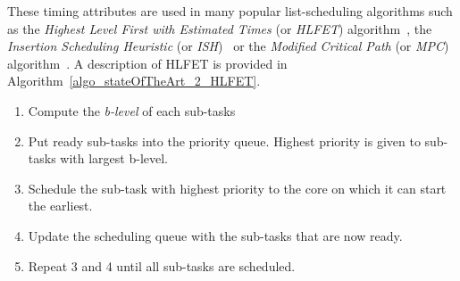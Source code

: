 \documentclass[main.tex]{subfiles}
\begin{document}
These timing attributes are used in many popular list-scheduling algorithms such as the \emph{Highest Level First with Estimated Times} (or \emph{HLFET}) algorithm~\cite{Adam1974}, the \emph{Insertion Scheduling Heuristic} (or \emph{ISH})~\cite{Kruatrachue1987} or the \emph{Modified Critical Path} (or \emph{MPC}) algorithm~\cite{Wu1990}. A description of HLFET is provided in Algorithm~\ref{algo_stateOfTheArt_2_HLFET}. 


\begin{algo}[HLFET] 
    \hfill
    \begin{enumerate}
        \item Compute the \emph{b-level} of each sub-tasks
        \item Put ready sub-tasks into the priority queue. Highest priority is given to sub-tasks with largest b-level.
        \item Schedule the sub-task with highest priority to the core on which it can start the earliest.
        \item Update the scheduling queue with the sub-tasks that are now ready.
        \item Repeat 3 and 4 until all sub-tasks are scheduled.
    \end{enumerate}
    \label{algo_stateOfTheArt_2_HLFET}
\end{algo}
\end{document}
